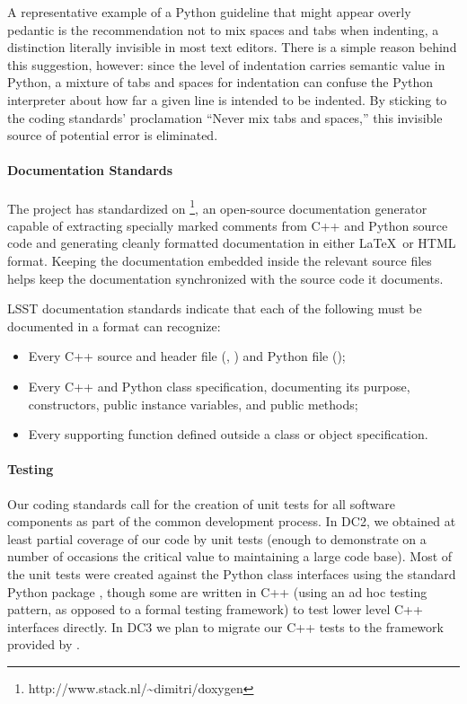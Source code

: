 A representative example of a Python guideline that might appear overly pedantic
is the recommendation not to mix spaces and tabs when indenting, a distinction
literally invisible in most text editors. There is a simple reason behind this
suggestion, however: since the level of indentation carries semantic value in
Python, a mixture of tabs and spaces for indentation can confuse the Python
interpreter about how far a given line is intended to be indented. By sticking
to the coding standards' proclamation ``Never mix tabs and spaces,'' this
invisible source of potential error is eliminated.

\paragraph{Documentation Standards}
\label{build_docs}

The project has standardized on 
\footnote{http://www.stack.nl/\~{}dimitri/doxygen},
an open-source documentation
generator capable of extracting specially marked comments from C++ and Python
source code and generating cleanly formatted documentation in either \LaTeX\ or
HTML format. Keeping the documentation embedded inside the relevant source files
helps keep the documentation synchronized with the source code it documents.


LSST documentation standards indicate that each of the following must be
documented in a format  can recognize:

\begin{itemize}

\item{Every C++ source and header file (, ) and Python file
    ();}

\item{Every C++ and Python class specification, documenting its purpose,
    constructors, public instance variables, and public methods;}

\item{Every supporting function defined outside a class or object specification.}

\end{itemize}

\paragraph{Testing}

Our coding standards call for the creation of unit tests for all
software components as part of the common development process.  In
DC2, we obtained at least partial coverage of our code by unit tests
(enough to demonstrate on a number of occasions the critical value to
maintaining a large code base).  Most of the unit tests were created
against the Python class interfaces using the standard Python package
, though some are written in C++ (using an ad hoc
testing pattern, as opposed to a formal testing framework) to test
lower level C++ interfaces directly.  In DC3 we plan to migrate our
C++ tests to the framework provided by .  


